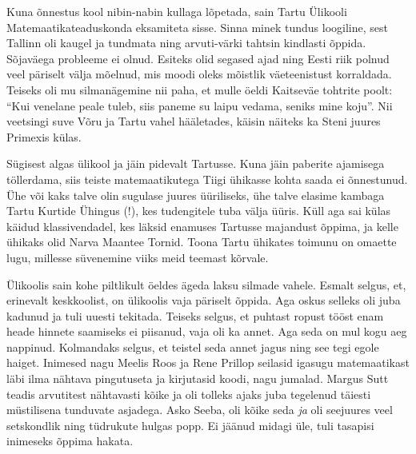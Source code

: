 Kuna õnnestus kool nibin-nabin kullaga lõpetada, sain Tartu Ülikooli Matemaatikateaduskonda eksamiteta sisse. Sinna minek tundus loogiline, sest Tallinn oli kaugel ja tundmata ning arvuti-värki tahtsin kindlasti õppida. Sõjaväega probleeme ei olnud. Esiteks olid segased ajad ning Eesti riik polnud veel päriselt välja mõelnud, mis moodi oleks mõistlik väeteenistust korraldada. Teiseks oli mu silmanägemine nii paha, et mulle öeldi Kaitseväe tohtrite poolt: \enquote{Kui venelane peale tuleb, siis paneme su laipu vedama, seniks mine koju}. Nii veetsingi suve Võru ja Tartu vahel hääletades, käisin näiteks ka Steni juures Primexis külas. 

Sügisest algas ülikool ja jäin pidevalt Tartusse. Kuna jäin paberite ajamisega töllerdama, siis teiste matemaatikutega Tiigi ühikasse kohta saada ei õnnestunud. Ühe või kaks talve olin sugulase juures üüriliseks, ühe talve elasime kambaga Tartu Kurtide Ühingus (!), kes tudengitele tuba välja üüris. Küll aga sai külas käidud klassivendadel, kes läksid enamuses Tartusse majandust õppima, ja kelle ühikaks olid Narva Maantee Tornid. Toona Tartu ühikates toimunu on omaette lugu, millesse süvenemine viiks meid teemast kõrvale.

Ülikoolis sain kohe piltlikult öeldes ägeda laksu silmade vahele. Esmalt selgus, et, erinevalt keskkoolist, on ülikoolis vaja päriselt õppida. Aga oskus selleks oli juba kadunud ja tuli uuesti tekitada. Teiseks selgus, et puhtast ropust tööst enam heade hinnete saamiseks ei piisanud, vaja oli ka annet. Aga seda on mul kogu aeg nappinud. Kolmandaks selgus, et teistel seda annet jagus ning see tegi egole haiget. Inimesed nagu Meelis Roos ja Rene Prillop seilasid igasugu matemaatikast läbi ilma nähtava pingutuseta ja kirjutasid koodi, nagu jumalad. Margus Sutt teadis arvutitest nähtavasti kõike ja oli tolleks ajaks juba tegelenud täiesti müstilisena tunduvate asjadega. Asko Seeba, oli kõike seda \emph{ja} oli seejuures veel setskondlik ning tüdrukute hulgas popp. Ei jäänud midagi üle, tuli tasapisi inimeseks õppima hakata. 

